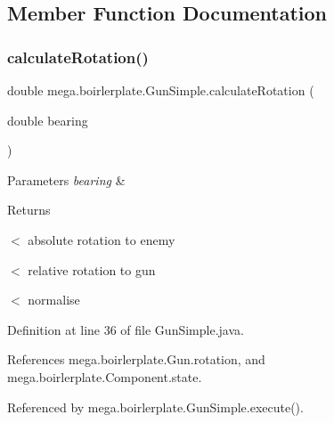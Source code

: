 \subsection{Member Function Documentation}
\mbox{\label{classmega_1_1boirlerplate_1_1_gun_simple_aed0232e41ad98dcf39f16dca772f2d4e}} 
\subsubsection{\texorpdfstring{calculate\+Rotation()}{calculateRotation()}}
{\footnotesize\ttfamily double mega.\+boirlerplate.\+Gun\+Simple.\+calculate\+Rotation (\begin{DoxyParamCaption}\item[{double}]{bearing }\end{DoxyParamCaption})\hspace{0.3cm}{\ttfamily [private]}}


\begin{DoxyParams}{Parameters}
{\em bearing} & \\
\hline
\end{DoxyParams}
\begin{DoxyReturn}{Returns}

\end{DoxyReturn}
$<$ absolute rotation to enemy

$<$ relative rotation to gun

$<$ normalise 

Definition at line 36 of file Gun\+Simple.\+java.



References mega.\+boirlerplate.\+Gun.\+rotation, and mega.\+boirlerplate.\+Component.\+state.



Referenced by mega.\+boirlerplate.\+Gun\+Simple.\+execute().

\mbox{\label{classmega_1_1boirlerplate_1_1_gun_simple_a5e0449b16dac5c1620c7bfa8ca8c7420}} 
